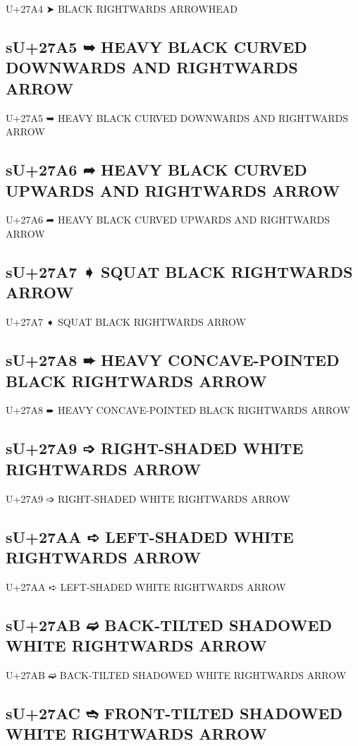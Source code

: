 U+27A4 ➤ BLACK RIGHTWARDS ARROWHEAD

\subsection{sU+27A5 ➥ HEAVY BLACK CURVED DOWNWARDS AND RIGHTWARDS ARROW}

U+27A5 ➥ HEAVY BLACK CURVED DOWNWARDS AND RIGHTWARDS ARROW

\subsection{sU+27A6 ➦ HEAVY BLACK CURVED UPWARDS AND RIGHTWARDS ARROW}

U+27A6 ➦ HEAVY BLACK CURVED UPWARDS AND RIGHTWARDS ARROW

\subsection{sU+27A7 ➧ SQUAT BLACK RIGHTWARDS ARROW}

U+27A7 ➧ SQUAT BLACK RIGHTWARDS ARROW

\subsection{sU+27A8 ➨ HEAVY CONCAVE-POINTED BLACK RIGHTWARDS ARROW}

U+27A8 ➨ HEAVY CONCAVE-POINTED BLACK RIGHTWARDS ARROW

\subsection{sU+27A9 ➩ RIGHT-SHADED WHITE RIGHTWARDS ARROW}

U+27A9 ➩ RIGHT-SHADED WHITE RIGHTWARDS ARROW

\subsection{sU+27AA ➪ LEFT-SHADED WHITE RIGHTWARDS ARROW}

U+27AA ➪ LEFT-SHADED WHITE RIGHTWARDS ARROW

\subsection{sU+27AB ➫ BACK-TILTED SHADOWED WHITE RIGHTWARDS ARROW}

U+27AB ➫ BACK-TILTED SHADOWED WHITE RIGHTWARDS ARROW

\subsection{sU+27AC ➬ FRONT-TILTED SHADOWED WHITE RIGHTWARDS ARROW}

